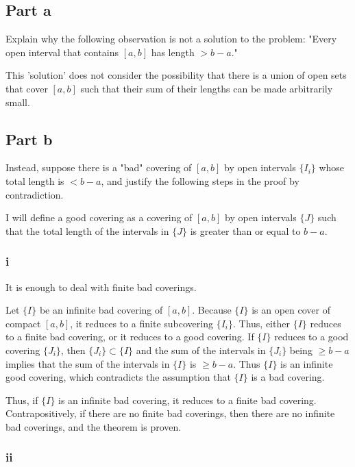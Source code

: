 \documentclass{article}
\begin{document}
\subsection*{Part a}

Explain why the following observation is not a solution to the problem: "Every open interval that contains $[a, b]$ has length $> b-a$."

This 'solution' does not consider the possibility that there is a union of open sets that cover $[a, b]$ such that their sum of their lengths can be made arbitrarily small.

\subsection*{Part b}

Instead, suppose there is a "bad" covering of $[a, b]$ by open intervals $\{I_i\}$ whose total length is $< b-a$, and justify the following steps in the proof by contradiction.

I will define a good covering as a covering of $[a, b]$ by open intervals $\{J\}$ such that the total length of the intervals in $\{J\}$ is greater than or equal to $b-a$.

\subsubsection*{i}

It is enough to deal with finite bad coverings.

Let $\{I\}$ be an infinite bad covering of $[a, b]$. Because $\{I\}$ is an open cover of compact $[a, b]$, it reduces to a finite subcovering $\{I_i\}$. Thus, either $\{I\}$ reduces to a finite bad covering, or it reduces to a good covering. If $\{I\}$ reduces to a good covering $\{J_i\}$, then  $\{J_i\} \subset \{I\}$ and the sum of the intervals in $\{J_i\}$ being $\geq b-a$ implies that the sum of the intervals in $\{I\}$ is $\geq b-a$. Thus $\{I\}$ is an infinite good covering, which contradicts the assumption that $\{I\}$ is a bad covering.

Thus, if $\{I\}$ is an infinite bad covering, it reduces to a finite bad covering. Contrapositively, if there are no finite bad coverings, then there are no infinite bad coverings, and the theorem is proven.

\subsubsection*{ii}
\end{document}
